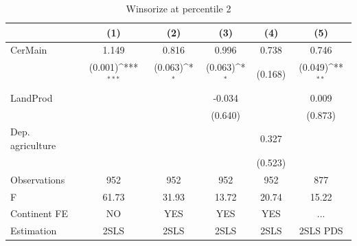 \documentclass[12pt,a4paper]{article}
\begin{document}
\begin{table}[htbp]\centering
\def\sym#1{\ifmmode^{#1}\else\(^{#1}\)\fi}
\caption{Winsorize at percentile 2}
\begin{tabular}{l*{5}{c}}
\hline\hline
                &\multicolumn{1}{c}{(1)}         &\multicolumn{1}{c}{(2)}         &\multicolumn{1}{c}{(3)}         &\multicolumn{1}{c}{(4)}         &\multicolumn{1}{c}{(5)}         \\
\hline
CerMain         &    1.149         &    0.816         &    0.996         &    0.738         &    0.746         \\
                &  (0.001)\sym{***}&  (0.063)\sym{*}  &  (0.063)\sym{*}  &  (0.168)         &  (0.049)\sym{**} \\
LandProd        &                  &                  &   -0.034         &                  &    0.009         \\
                &                  &                  &  (0.640)         &                  &  (0.873)         \\
Dep. agriculture&                  &                  &                  &    0.327         &                  \\
                &                  &                  &                  &  (0.523)         &                  \\
\hline
Observations    &      952         &      952         &      952         &      952         &      877         \\
F               &    61.73         &    31.93         &    13.72         &    20.74         &    15.22         \\
Continent FE    &       NO         &      YES         &      YES         &      YES         &      ...         \\
Estimation      &     2SLS         &     2SLS         &     2SLS         &     2SLS         & 2SLS PDS         \\
\hline\hline
\end{tabular}
\end{table}
\end{document}
